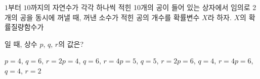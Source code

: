 $1$부터 $10$까지의 자연수가 각각 하나씩 적힌 10개의 공이 들어 있는 상자에서 임의로 2개의 공을 동시에 꺼낼 때, 꺼낸 소수가 적힌 공의 개수를 확률변수 $X$라 하자. $X$의 확률질량함수가\par\smallskip{}\par\smallskip\noindent 일 때, 상수 $p$, $q$, $r$의 값은?
\begin{choicesii}{$p=4$, $q=6$, $r=2$}{$p=4$, $q=6$, $r=4$}{$p=5$, $q=5$, $r=2$}{$p=6$, $q=4$, $r=4$}{$p=6$, $q=4$, $r=2$}\end{choicesii}
